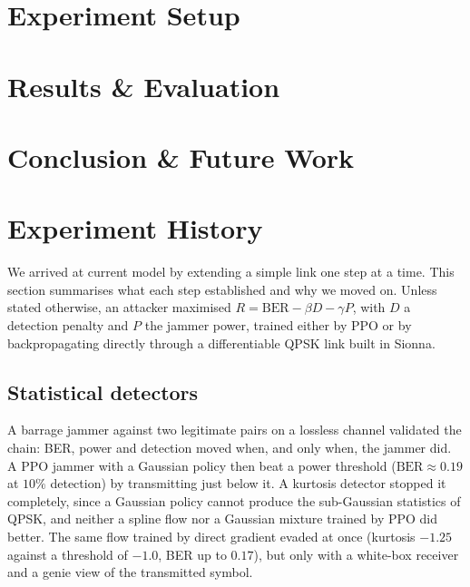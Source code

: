 \documentclass[conference]{IEEEtran}
\newcommand{\adm}[1]{{\color{orange}{[#1]}}}
\begin{document}
\adm{important: the main contrib now seems the application of some neural architecture for this problem. discussing a novelty in the neural architecture or in how defenders and attackers interact, coordinate, and syncronize within themselves could strengthen the contribution's novelty}

\section{Experiment Setup}
\label{sec:setup}
\section{Results \& Evaluation}
\section{Conclusion \& Future Work}




\clearpage
\appendices
\section{Experiment History}
\label{sec:exphist}
We arrived at current model by extending a simple link one step at a time.
This section summarises what each step established and why we moved on.
Unless stated otherwise, an attacker maximised $R = \mathrm{BER} - \beta D - \gamma P$, with $D$ a
detection penalty and $P$ the jammer power, trained either by PPO or by backpropagating directly
through a differentiable QPSK link built in Sionna.

\subsection{Statistical detectors}
A barrage jammer against two legitimate pairs on a lossless channel validated the chain: BER, power and
detection moved when, and only when, the jammer did.
A PPO jammer with a Gaussian policy then beat a power threshold ($\mathrm{BER} \approx 0.19$ at
$10\%$ detection) by transmitting just below it.
A kurtosis detector stopped it completely, since a Gaussian policy cannot produce the sub-Gaussian
statistics of QPSK, and neither a spline flow nor a Gaussian mixture trained by PPO did better.
The same flow trained by direct gradient evaded at once (kurtosis $-1.25$ against a threshold of
$-1.0$, BER up to $0.17$), but only with a white-box receiver and a genie view of the transmitted
symbol.
\end{document}
